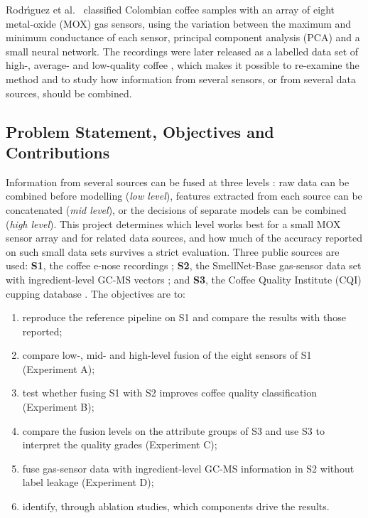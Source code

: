\documentclass[12pt]{article}
\begin{document}
Rodr\'{\i}guez et al.\ \cite{rodriguez2010electronic} classified Colombian coffee samples with an array of eight metal-oxide (MOX) gas sensors, using the variation between the maximum and minimum conductance of each sensor, principal component analysis (PCA) and a small neural network. The recordings were later released as a labelled data set of high-, average- and low-quality coffee \cite{rodriguezgamboa2020dataset}, which makes it possible to re-examine the method and to study how information from several sensors, or from several data sources, should be combined.

\subsection{Problem Statement, Objectives and Contributions}

Information from several sources can be fused at three levels \cite{hall1997introduction,borras2015data}: raw data can be combined before modelling (\emph{low level}), features extracted from each source can be concatenated (\emph{mid level}), or the decisions of separate models can be combined (\emph{high level}). This project determines which level works best for a small MOX sensor array and for related data sources, and how much of the accuracy reported on such small data sets survives a strict evaluation. Three public sources are used: \textbf{S1}, the coffee e-nose recordings \cite{rodriguezgamboa2020dataset}; \textbf{S2}, the SmellNet-Base gas-sensor data set with ingredient-level GC-MS vectors \cite{feng2026smellnet}; and \textbf{S3}, the Coffee Quality Institute (CQI) cupping database \cite{ledoux2018cqi}. The objectives are to:
\begin{enumerate}[label=O\arabic*.]
\item reproduce the reference pipeline \cite{rodriguez2010electronic} on S1 and compare the results with those reported;
\item compare low-, mid- and high-level fusion of the eight sensors of S1 (Experiment A);
\item test whether fusing S1 with S2 improves coffee quality classification (Experiment B);
\item compare the fusion levels on the attribute groups of S3 and use S3 to interpret the quality grades (Experiment C);
\item fuse gas-sensor data with ingredient-level GC-MS information in S2 without label leakage (Experiment D);
\item identify, through ablation studies, which components drive the results.
\end{enumerate}
\end{document}

